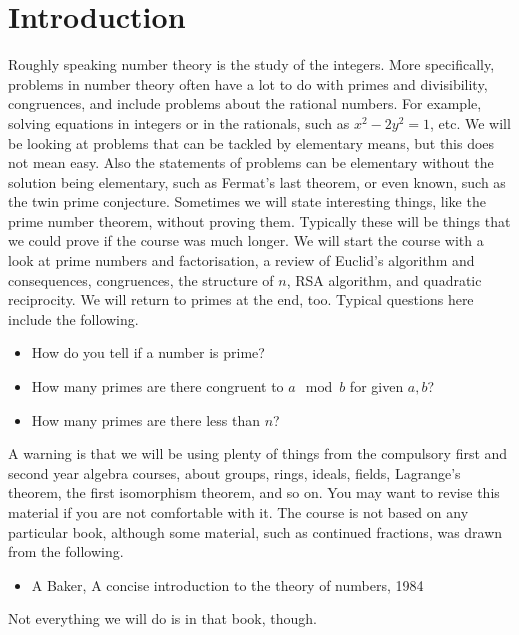 \def\module{M3P14 Number Theory}
\def\lecturer{Prof Toby Gee}
\def\term{Autumn 2018}







\section{Introduction}


Roughly speaking number theory is the study of the integers. More specifically, problems in number theory often have a lot to do with primes and divisibility, congruences, and include problems about the rational numbers. For example, solving equations in integers or in the rationals, such as $ x^2 - 2y^2 = 1 $, etc. We will be looking at problems that can be tackled by elementary means, but this does not mean easy. Also the statements of problems can be elementary without the solution being elementary, such as Fermat's last theorem, or even known, such as the twin prime conjecture. Sometimes we will state interesting things, like the prime number theorem, without proving them. Typically these will be things that we could prove if the course was much longer. We will start the course with a look at prime numbers and factorisation, a review of Euclid's algorithm and consequences, congruences, the structure of $ \unit{n} $, RSA algorithm, and quadratic reciprocity. We will return to primes at the end, too. Typical questions here include the following.
\begin{itemize}
\item How do you tell if a number is prime?
\item How many primes are there congruent to $ a \mod b $ for given $ a, b $?
\item How many primes are there less than $ n $?
\end{itemize}
A warning is that we will be using plenty of things from the compulsory first and second year algebra courses, about groups, rings, ideals, fields, Lagrange's theorem, the first isomorphism theorem, and so on. You may want to revise this material if you are not comfortable with it. The course is not based on any particular book, although some material, such as continued fractions, was drawn from the following.
\begin{itemize}
\item A Baker, A concise introduction to the theory of numbers, 1984
\end{itemize}
Not everything we will do is in that book, though.

